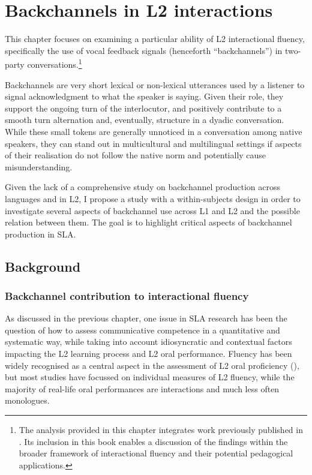 \chapter{Backchannels in L2 interactions}
\graphicspath{{figures/plots-chapter-4}}
\label{chap:4}
This chapter focuses on examining a particular ability of L2 interactional fluency, specifically the use of vocal feedback signals (henceforth “backchannels”) in two-party conversations.\footnote{The analysis provided in this chapter integrates work previously published in \citet{SbrannaEtAl2022,SbrannaEtAl2023,SbrannaEtAl2024}. Its inclusion in this book enables a discussion of the findings within the broader framework of interactional fluency and their potential pedagogical applications.}

Backchannels are very short lexical or non-lexical utterances used by a listener to signal acknowledgment to what the speaker is saying. Given their role, they support the ongoing turn of the interlocutor, and positively contribute to a smooth turn alternation and, eventually, structure in a dyadic conversation. While these small tokens are generally unnoticed in a conversation among native speakers, they can stand out in multicultural and multilingual settings if aspects of their realisation do not follow the native norm and potentially cause misunderstanding. 

Given the lack of a comprehensive study on backchannel production across languages and in L2, I propose a study with a within-subjects design in order to investigate several aspects of backchannel use across L1 and L2 and the possible relation between them. The goal is to highlight critical aspects of backchannel production in SLA. 

\section{Background}
\label{sec:4.1}
\subsection{Backchannel contribution to interactional fluency}
\label{sec:4.1.1}
As discussed in the previous chapter, one issue in SLA research has been the question of how to assess communicative competence in a quantitative and systematic way, while taking into account idiosyncratic and contextual factors impacting the L2 learning process and L2 oral performance. Fluency has been widely recognised as a central aspect in the assessment of L2 oral proficiency (\citealt{DeJong2016}), but most studies have focussed on individual measures of L2 fluency, while the majority of real-life oral performances are interactions and much less often monologues.

